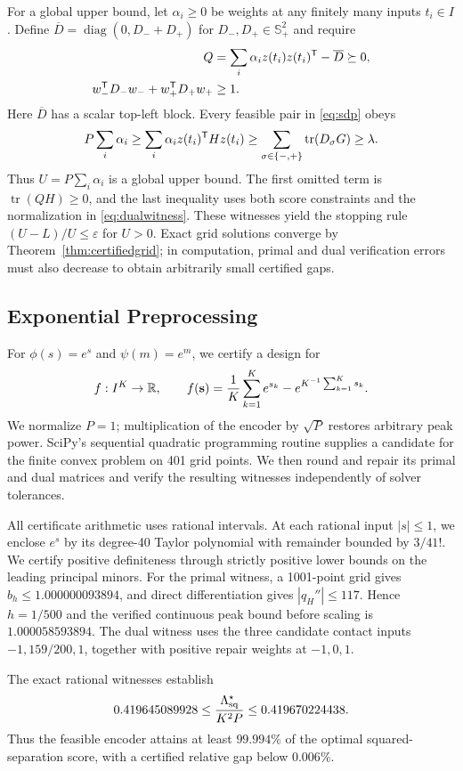 For a global upper bound, let $\alpha_i\ge0$ be weights at any finitely many inputs $t_i\in I$. Define $\overline D=\operatorname{diag}(0,D_-+D_+)$ for $D_-,D_+\in\mathbb S_+^2$ and require
\begin{align}
 Q&=\sum_i\alpha_i z(t_i)z(t_i)^\mathsf T-\overline D\succeq0,\label{eq:dualwitness}\\
 w_-^\mathsf T D_-w_-+w_+^\mathsf T D_+w_+&\ge1.\nonumber
\end{align}
Here $\overline D$ has a scalar top-left block. Every feasible pair in \eqref{eq:sdp} obeys
$$
 P\sum_i\alpha_i\ge\sum_i\alpha_i z(t_i)^\mathsf T Hz(t_i)
 \ge\sum_{\sigma\in\{-,+\}}\operatorname{tr}(D_\sigma G)
 \ge\lambda.
$$
Thus $U=P\sum_i\alpha_i$ is a global upper bound. The first omitted term is $\operatorname{tr}(QH)\ge0$, and the last inequality uses both score constraints and the normalization in \eqref{eq:dualwitness}. These witnesses yield the stopping rule $(U-L)/U\le\varepsilon$ for $U>0$. Exact grid solutions converge by Theorem~\ref{thm:certifiedgrid}; in computation, primal and dual verification errors must also decrease to obtain arbitrarily small certified gaps.

\subsection{Exponential Preprocessing}
For $\phi(s)=e^s$ and $\psi(m)=e^m$, we certify a design for
$$
 f:I^K\to\mathbb R,\qquad f(\mathbf s)=\frac1K\sum_{k=1}^K e^{s_k}-e^{K^{-1}\sum_{k=1}^K s_k}.
$$
We normalize $P=1$; multiplication of the encoder by $\sqrt P$ restores arbitrary peak power. SciPy's sequential quadratic programming routine supplies a candidate for the finite convex problem on 401 grid points. We then round and repair its primal and dual matrices and verify the resulting witnesses independently of solver tolerances.

All certificate arithmetic uses rational intervals. At each rational input $|s|\le1$, we enclose $e^s$ by its degree-40 Taylor polynomial with remainder bounded by $3/41!$. We certify positive definiteness through strictly positive lower bounds on the leading principal minors. For the primal witness, a 1001-point grid gives $b_h\le1.000000093894$, and direct differentiation gives $|q_H''|\le117$. Hence $h=1/500$ and the verified continuous peak bound before scaling is $1.000058593894$. The dual witness uses the three candidate contact inputs $-1,159/200,1$, together with positive repair weights at $-1,0,1$.

The exact rational witnesses establish
\begin{equation}
 0.419645089928\le
 \frac{\Lambda_{\mathrm{sq}}^\star}{K^2P}
 \le0.419670224438.
 \label{eq:expcertificate}
\end{equation}
Thus the feasible encoder attains at least $99.994\%$ of the optimal squared-separation score, with a certified relative gap below $0.006\%$.

